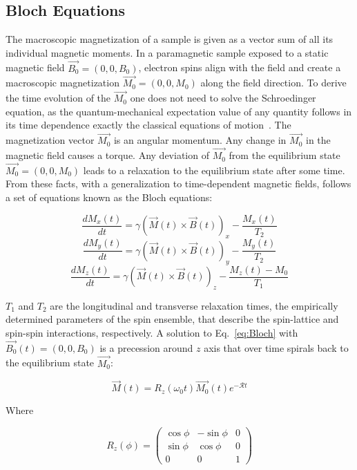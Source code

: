 \subsection{Bloch Equations}
The macroscopic magnetization of a sample is given as a vector sum of all its individual magnetic moments. In a paramagnetic sample exposed to a static magnetic field $\vec{B_0}=\left(0,0,B_0\right)$, electron spins align with the field and create a macroscopic magnetization $\vec{M_0}=\left(0,0,M_0\right)$ along the field direction. To derive the time evolution of the $\vec{M_0}$ one does not need to solve the Schroedinger equation, as the quantum-mechanical expectation value of any quantity follows in its time dependence exactly the classical equations of motion~\cite{Bloch_1946}. The magnetization vector $\vec{M_0}$ is an angular momentum. Any change in $\vec{M_0}$ in the magnetic field causes a torque. Any deviation of $\vec{M_0}$ from the equilibrium state $\vec{M_0}=\left(0,0,M_0\right)$ leads to a relaxation to the equilibrium state after some time. From these facts, with a generalization to time-dependent magnetic fields, follows a set of equations known as the Bloch equations:

\begin{equation}
\label{eq:Bloch}
\frac{dM_x(t)}{dt} = \gamma\left(\vec{M}(t)\times\vec{B}(t)\right)_x - \frac{M_x(t)}{T_2}
\end{equation}
\begin{equation}
\nonumber
\frac{dM_y(t)}{dt} = \gamma\left(\vec{M}(t)\times\vec{B}(t)\right)_y - \frac{M_y(t)}{T_2}
\end{equation}
\begin{equation}
\nonumber
\frac{dM_z(t)}{dt} = \gamma\left(\vec{M}(t)\times\vec{B}(t)\right)_z - \frac{M_z(t)-M_0}{T_1}
\end{equation}

$T_1$ and $T_2$ are the longitudinal and transverse relaxation times, the empirically determined parameters of the spin ensemble, that describe the spin-lattice and spin-spin interactions, respectively. A solution to Eq.~\ref{eq:Bloch} with $\vec{B_0}(t) = \left(0,0,B_0\right)$ is a precession around $z$ axis that over time spirals back to the equilibrium state $\vec{M_0}$:


\begin{equation}
\vec{M}(t)=R_z(\omega_0t)\vec{M_0}(t)e{^{-\mathscr{R}t}}
\end{equation}

Where 

\begin{equation}
R_z(\phi)=
\begin{pmatrix}
    \cos{\phi} & -\sin{\phi} & 0\\
	\sin{\phi} & \cos{\phi} & 0\\
	0 & 0 & 1
  \end{pmatrix}
\end{equation}

